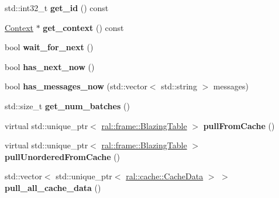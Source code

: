 \begin{DoxyCompactItemize}
std\+::int32\+\_\+t {\bfseries get\+\_\+id} () const
\item 
\mbox{\label{classral_1_1cache_1_1CacheMachine_a015581f7d6250f93a467f0c31f3cff78}} 
\hyperlink{classblazingdb_1_1manager_1_1Context}{Context} $\ast$ {\bfseries get\+\_\+context} () const
\item 
\mbox{\label{classral_1_1cache_1_1CacheMachine_a0f2849bf7c9d8b32f66a811cae4e78b3}} 
bool {\bfseries wait\+\_\+for\+\_\+next} ()
\item 
\mbox{\label{classral_1_1cache_1_1CacheMachine_ac1b8751e117b03c5f139f84958047a70}} 
bool {\bfseries has\+\_\+next\+\_\+now} ()
\item 
\mbox{\label{classral_1_1cache_1_1CacheMachine_a0a1c9eec7f235b501fa7c89724c17bc3}} 
bool {\bfseries has\+\_\+messages\+\_\+now} (std\+::vector$<$ std\+::string $>$ messages)
\item 
\mbox{\label{classral_1_1cache_1_1CacheMachine_abc6a926c6a31b4733c0c6c0f47e4683d}} 
std\+::size\+\_\+t {\bfseries get\+\_\+num\+\_\+batches} ()
\item 
\mbox{\label{classral_1_1cache_1_1CacheMachine_ab3e6a40003af362a3f35b07ac7621659}} 
virtual std\+::unique\+\_\+ptr$<$ \hyperlink{classral_1_1frame_1_1BlazingTable}{ral\+::frame\+::\+Blazing\+Table} $>$ {\bfseries pull\+From\+Cache} ()
\item 
\mbox{\label{classral_1_1cache_1_1CacheMachine_a6231339e90316bef6e87a0956276da90}} 
virtual std\+::unique\+\_\+ptr$<$ \hyperlink{classral_1_1frame_1_1BlazingTable}{ral\+::frame\+::\+Blazing\+Table} $>$ {\bfseries pull\+Unordered\+From\+Cache} ()
\item 
\mbox{\label{classral_1_1cache_1_1CacheMachine_a0f021fd997c60f3c25bf865e3e4b21e6}} 
std\+::vector$<$ std\+::unique\+\_\+ptr$<$ \hyperlink{classral_1_1cache_1_1CacheData}{ral\+::cache\+::\+Cache\+Data} $>$ $>$ {\bfseries pull\+\_\+all\+\_\+cache\+\_\+data} ()
\item 

\end{DoxyCompactItemize}
